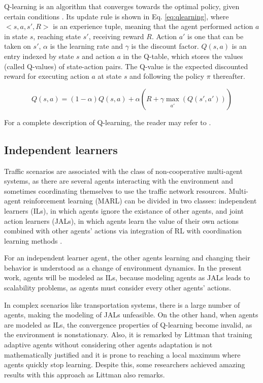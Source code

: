 \documentclass{RITA}
\begin{document}
Q-learning is an algorithm that converges towards the optimal policy, given certain conditions \cite{Watkins&Dayan1992}. Its update rule is shown in Eq. \eqref{eq:qlearning}, where $<s,a,s',R>$ is an experience tuple, meaning that the agent performed action $a$ in state $s$, reaching state $s'$, receiving reward $R$. Action $a'$ is one that can be taken on $s'$, $\alpha$ is the learning rate and $\gamma$ is the discount factor. $Q(s,a)$ is an entry indexed by state $s$ and action $a$ in the Q-table, which stores the values (called Q-values) of state-action pairs. The Q-value is the expected discounted reward for executing action $a$ at
state $s$ and following the policy $\pi$ thereafter.

\begin{equation}
\label{eq:qlearning}
Q(s,a) = (1 - \alpha) Q(s,a) + \alpha (R + \gamma \max_{\substack{a'}}(Q(s',a')))
\end{equation}

For a complete description of Q-learning, the reader may refer to \cite{Watkins&Dayan1992}.



\subsection{Independent learners} 
Traffic scenarios are associated with the class of non-cooperative multi-agent systems, as there are several agents interacting with the environment and sometimes coordinating themselves to use the traffic network resources. Multi-agent reinforcement learning (MARL) can be divided in two classes: independent learners (ILs), in which agents ignore the existance of other agents, and joint action learners (JALs), in which agents learn the value of their own actions combined with other agents' actions via integration of RL with coordination learning methods \cite{Claus&Boutilier1998}. 

For an independent learner agent, the other agents learning and changing their behavior is understood as a change of environment dynamics. In the present work, agents will be modeled as ILs, because modeling agents as JALs leads to scalability problems, as agents must consider every other agents' actions. 

In complex scenarios like transportation systems, there is a large number of agents, making the modeling of JALs unfeasible. On the other hand, when agents are modeled as ILs, the convergence properties of Q-learning become invalid, as the environment is nonstationary. Also, it is remarked by Littman \cite{Littman1994} that training adaptive agents without considering other agents adaptation is not mathematically justified and it is prone to reaching a local maximum where agents quickly stop learning. Despite this, some researchers achieved amazing results with this approach as Littman \cite{Littman1994} also remarks.
\end{document}

